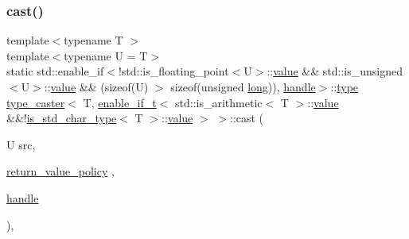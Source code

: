 \mbox{\label{structtype__caster_3_01_t_00_01enable__if__t_3_01std_1_1is__arithmetic_3_01_t_01_4_1_1value_01_624f9972c532456d927e4470192416960_a642af58128a1d3b551de5491484636db}} 
\subsubsection{\texorpdfstring{cast()}{cast()}\hspace{0.1cm}{\footnotesize\ttfamily [5/5]}}
{\footnotesize\ttfamily template$<$typename T $>$ \\
template$<$typename U  = T$>$ \\
static std\+::enable\+\_\+if$<$!std\+::is\+\_\+floating\+\_\+point$<$U$>$\+::\mbox{\hyperlink{_s_d_l__opengl__glext_8h_a8ad81492d410ff2ac11f754f4042150f}{value}} \&\& std\+::is\+\_\+unsigned$<$U$>$\+::\mbox{\hyperlink{_s_d_l__opengl__glext_8h_a8ad81492d410ff2ac11f754f4042150f}{value}} \&\& (sizeof(U) $>$ sizeof(unsigned \mbox{\hyperlink{modsupport_8h_a0cb68e00fb9fb1260ee2daadd9fe6611}{long}})), \mbox{\hyperlink{classhandle}{handle}}$>$\+::\mbox{\hyperlink{_s_d_l__opengl_8h_ad5ddf6fca7b585646515660e810e0188}{type}} \mbox{\hyperlink{classtype__caster}{type\+\_\+caster}}$<$ T, \mbox{\hyperlink{detail_2common_8h_a012819c9e8b5e04872a271f50f8b8196}{enable\+\_\+if\+\_\+t}}$<$ std\+::is\+\_\+arithmetic$<$ T $>$\+::\mbox{\hyperlink{_s_d_l__opengl__glext_8h_a8ad81492d410ff2ac11f754f4042150f}{value}} \&\&!\mbox{\hyperlink{cast_8h_a0ee0eaf3d12f9b0e472ed620777ba3c3}{is\+\_\+std\+\_\+char\+\_\+type}}$<$ T $>$\+::\mbox{\hyperlink{_s_d_l__opengl__glext_8h_a8ad81492d410ff2ac11f754f4042150f}{value}} $>$ $>$\+::cast (\begin{DoxyParamCaption}\item[{U}]{src,  }\item[{\mbox{\hyperlink{detail_2common_8h_adde72ab1fb0dd4b48a5232c349a53841}{return\+\_\+value\+\_\+policy}}}]{,  }\item[{\mbox{\hyperlink{classhandle}{handle}}}]{ }\end{DoxyParamCaption})\hspace{0.3cm}{\ttfamily [inline]}, {\ttfamily [static]}}

